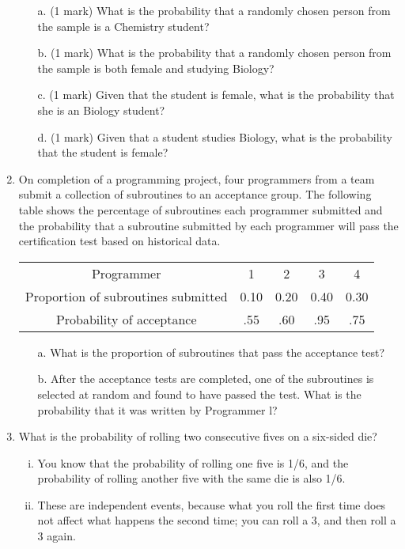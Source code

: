 \documentclass[]{report}
\begin{document}
\begin{enumerate}[(1)]
\begin{itemize}
\item[a.] (1 mark) What is the probability that a randomly chosen person from the sample is a
Chemistry student?
\item[b.] (1 mark) What is the probability that a randomly chosen person from the sample is both female and studying Biology?
\item[c.] (1 mark) Given that the student is female, what is the probability that she is an
Biology student?
\item[d.] (1 mark) Given that a student studies Biology, what is the probability that the student is female?
\end{itemize}

\item 
On completion of a programming project, four programmers from a
team submit a collection of subroutines to an acceptance group. The
following table shows the percentage of subroutines each programmer
submitted and the probability that a subroutine submitted by each
programmer will pass the certification test based on historical data.
\begin{center}
\begin{tabular}{|c|c|c|c|c|}
\hline
Programmer & 1 & 2 & 3 & 4 \\
Proportion of subroutines submitted & 0.10 & 0.20 & 0.40 & 0.30 \\
Probability of acceptance & .55 & .60 & .95 & .75 \\
\hline
\end{tabular}
\end{center}
\begin{itemize}
\item[a.] What is the proportion of subroutines that pass the acceptance test?
\item[b.] After the acceptance tests are completed, one of the subroutines is
selected at random and found to have passed the test. What is the
probability that it was written by Programmer l?
\end{itemize}



\item What is the probability of rolling two consecutive fives on a six-sided die?
\begin{enumerate}[(i)]
	\item You know that the probability of rolling one five is 1/6, and the probability of rolling another five with the same die is also 1/6.
	\item These are independent events, because what you roll the first time does not affect what happens the second time; you can roll a 3, and then roll a 3 again.
\end{enumerate}


\end{enumerate}
\end{document}

